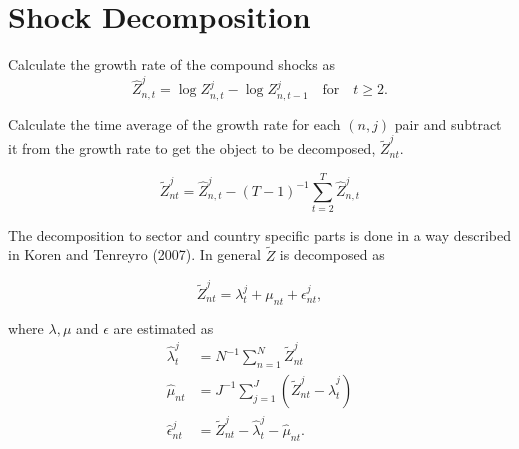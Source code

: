 \documentclass[11pt]{article}
\begin{document}
\thispagestyle{empty}

\section{Shock Decomposition}
Calculate the growth rate of the compound shocks as 
$$\hat{Z}^j_{n,t} = \log{Z^j_{n,t}} - \log{Z^j_{n,t - 1}} \quad \mbox{for} \quad t\geq2. $$

Calculate the time average of the growth rate for each $(n,j)$ pair and subtract it from the growth rate to get the object to be decomposed, $\tilde{Z}^j_{nt}$.

$$\tilde{Z}^j_{nt} = \hat{Z}^j_{n,t} - (T - 1)^{-1} \sum_{t=2}^T \hat{Z}^j_{n,t}$$

The decomposition to sector and country specific parts is done in a way described in Koren and Tenreyro (2007). 
In general $\tilde{Z}$ is decomposed as

$$\tilde{Z}^j_{nt} = \lambda^j_t + \mu_{nt} + \epsilon^j_{nt},$$

where $\lambda, \mu$ and $\epsilon$ are estimated as
\begin{align*}
\hat{\lambda}^j_t &= N^{-1} \sum_{n=1}^N  \tilde{Z}^j_{nt} \\
\hat{\mu}_{nt} &= J^{-1} \sum_{j=1}^J \left(\tilde{Z}^j_{nt} - \hat{\lambda}^j_t\right)\\
\hat{\epsilon}^j_{nt} &= \tilde{Z}^j_{nt} - \hat{\lambda}^j_t - \hat{\mu}_{nt}.
\end{align*}
\end{document}
